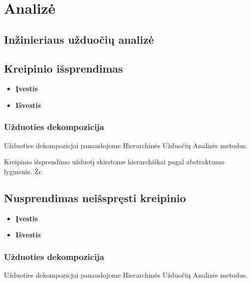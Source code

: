 
\section{Analizė}

\subsection {Inžinieriaus užduočių analizė}

	\subsection {Kreipinio išsprendimas}
	
		\begin{itemize}
			\item \textbf{Įvestis}
			\item \textbf{Išvestis} 
		\end{itemize}
		
	\subsubsection {Užduoties dekompozicija}
	
	Užduoties dekompozicjai panaudojome Hierarchinės Užduočių Analizės metodus.
 		
	
	Kreipinio išsprendimo užduotį skirstome hierarchiškai pagal abstraktumo lygmenis. Žr. 

	\subsection {Nusprendimas neišspręsti kreipinio}
	
		\begin{itemize}
			\item \textbf{Įvestis}
			\item \textbf{Išvestis} 
		\end{itemize}
		
	\subsubsection {Užduoties dekompozicija}
	
	Užduoties dekompozicjai panaudojome Hierarchinės Užduočių Analizės metodus.
 		
